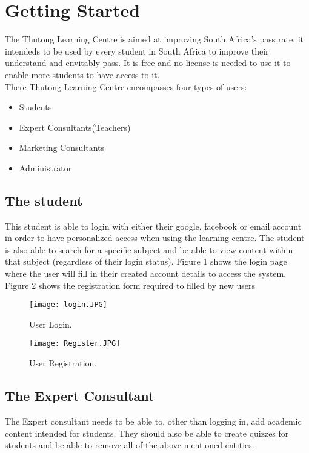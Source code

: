 \documentclass[12pt,a4paper]{article}
\begin{document}
		
	\section{Getting Started}
		The Thutong Learning Centre is aimed at improving South Africa's pass rate; it intendeds to be used by every student in South Africa to improve their understand and envitably pass. It is free and no license is needed to use it to enable more students to have access to it.\\
		There Thutong Learning Centre encompasses four types of users:
		\begin{itemize}
			\item Students
			\item Expert Consultants(Teachers)
			\item Marketing Consultants
			\item Administrator
		\end{itemize} 
		  
		\subsection{The student}
		 This student is able to login with either their google, facebook or email account in order to have personalized access when using the learning centre. The student is also able to search for a specific subject and be able to view content within that subject (regardless of their login status). Figure 1 shows the login page where the user will fill in their created account details to access the system. Figure 2 shows the registration form required to filled by new users\\
		 
		 
		 \begin{figure}
		 	\texttt{[image: login.JPG]}
		 	\caption{User Login.}
		 	\label{fig:user login}
		 \end{figure}
		 
		 \begin{figure}
		 	\texttt{[image: Register.JPG]}
		 	\caption{User Registration.}
		 	\label{fig:user registration}
		 \end{figure}
		 
		 \subsection{The Expert Consultant}
		 The Expert consultant needs to be able to, other than logging in, add academic content intended for students. They should also be able to create quizzes for students and be able to remove all of the above-mentioned entities.
		
\end{document}
